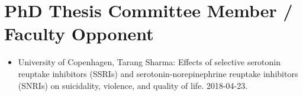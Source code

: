 \documentclass[10pt,a4paper,twocolumn]{article}
\begin{document}

\section{PhD Thesis Committee Member / Faculty Opponent}
\begin{itemize}

    \item University of Copenhagen, Tarang Sharma: Effects of selective serotonin reuptake inhibitors (SSRIs) and serotonin-norepinephrine reuptake inhibitors (SNRIs) on suicidality, violence, and quality of life. 2018-04-23.

\end{itemize}


\end{document}
